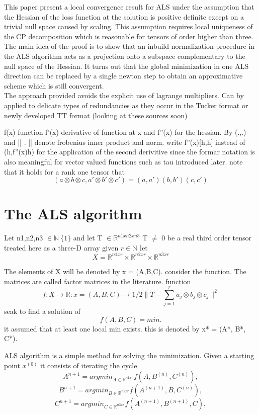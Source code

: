 \documentclass[10pt, draft]{article}
\begin{document}
 This paper present a local convergence result for ALS under the assumption that the Hessian of the loss function at the solution is positive definite execpt on a trivial null space caused by scaling.  This assumption requires local uniqueness of the CP decomposition which is reasonable for tensors of order higher than three.  The main idea of the proof is to show that an inbuild normalization procedure in the ALS algorithm acts as a projection onto a subspace complementary to the null space of the Hessian.  It turns out that the global minimization in one ALS direction can be replaced by a single newton step to obtain an approximative scheme which is still convergent.  \\
 The approach provided avoids the explicit use of lagrange multipliers.  Can by applied to delicate types of redundancies as they occur in the Tucker format or newly developed TT format (looking at these sources soon)\linebreak[1]
 
 f(x) function f'(x) derivative of function at x and f''(x) for the hessian.  By (.,.) and || . || denote frobenius inner product and norm.  write f''(x)[h,h] instead of (h,f''(x)h) for the application of the second derivitive since the formar notation is also meaningful for vector valued functions such as tau introduced later.  note that it holds for a rank one tensor that 
 \[ (a\otimes b\otimes c, a'\otimes b'\otimes c') = (a,a')(b,b')(c,c')\]
 
 
 \section{The ALS algorithm}
 Let n1,n2,n3 $\in \mathbb{N} \ \{1\}$ and let T $\in \mathbb{R}^{n1xn2xn3}$ T $\neq$ 0 be a real third order tensor treated here as a three-D array given $r\in \mathbb{N}$ let
 \[ X = \mathbb{R}^{n1xr} \times \mathbb{R}^{n2xr} \times \mathbb{R}^{n3xr}\]
 
 The elements of X will be denoted by x = (A,B,C). consider the function. The matrices are called factor matrices in the literature.  function
 \[f: X \rightarrow \mathbb{R} : x = (A,B,C) \rightarrow 1/2 \| T - \sum_{j=1}^r a_j \otimes b_j \otimes c_j \|^2 \]
 seak to find a solution of 
 \[f(A,B,C) = min.\]
 it assumed that at least one local min exists.  this is denoted by x* = (A*, B*, C*).\linebreak[1]
 
 ALS algorithm is a simple method for solving the minimization.  Given a starting point $x^{(0)}$ it consists of iterating the cycle 
 \[A^{n+1} = argmin _{A\in \mathbb{R}^{n1xr}}f(A,B^{(n)},C^{(n)}),\]
 \[B^{n+1} = argmin _{B\in \mathbb{R}^{n2xr}}f(A^{(n+1)},B,C^{(n)}),\]
  \[C^{n+1} = argmin _{C\in \mathbb{R}^{n3xr}}f(A^{(n+1)},B^{(n+1)},C),\]
  
\end{document}
